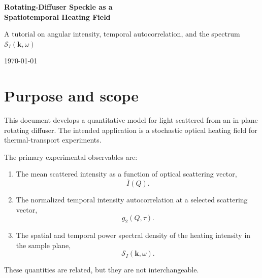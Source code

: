 \documentclass[11pt]{article}
\newcommand{\SII}{\mathcal{S}_{I}}
\newcommand{\kvec}{\mathbf{k}}
\begin{document}
\begin{center}
    {\LARGE\bfseries Rotating-Diffuser Speckle as a\\
    Spatiotemporal Heating Field}

    \vspace{0.5em}

    {\large A tutorial on angular intensity, temporal autocorrelation,
    and the spectrum $\mathcal{S}_I(\mathbf{k},\omega)$}

    \vspace{1em}

    \today
\end{center}

\tableofcontents

\newpage

\section{Purpose and scope}

This document develops a quantitative model for light scattered from an
in-plane rotating diffuser. The intended application is a stochastic optical
heating field for thermal-transport experiments.

The primary experimental observables are:

\begin{enumerate}[label=\arabic*.]
    \item The mean scattered intensity as a function of optical scattering
    vector,
    \begin{equation}
        \overline{I}(Q).
    \end{equation}

    \item The normalized temporal intensity autocorrelation at a selected
    scattering vector,
    \begin{equation}
        g_2(Q,\tau).
    \end{equation}

    \item The spatial and temporal power spectral density of the heating
    intensity in the sample plane,
    \begin{equation}
        \SII(\kvec,\omega).
    \end{equation}
\end{enumerate}

These quantities are related, but they are not interchangeable.
\end{document}
